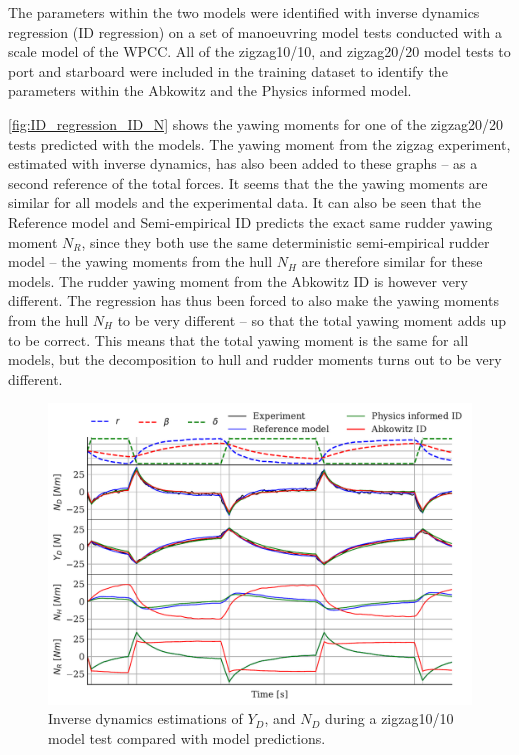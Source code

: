 The parameters within the two models were identified with inverse dynamics regression (ID regression) on a set of manoeuvring model tests conducted with a scale model of the WPCC. All of the zigzag10/10, and zigzag20/20 model tests to port and starboard were included in the training dataset to identify the parameters within the Abkowitz and the Physics informed model.

\autoref{fig:ID_regression_ID_N} shows the yawing moments for one of the zigzag20/20 tests predicted with the models. The yawing moment from the zigzag experiment, estimated with inverse dynamics, has also been added to these graphs -- as a second reference of the total forces. It seems that the the yawing moments are similar for all models and the experimental data. It can also be seen that the Reference model and Semi-empirical ID predicts the exact same rudder yawing moment $N_R$, since they both use the same deterministic semi-empirical rudder model -- the yawing moments from the hull $N_H$ are therefore similar for these models. The rudder yawing moment from the Abkowitz ID is however very different. The regression has thus been forced to also make the yawing moments from the hull $N_H$ to be very different -- so that the total yawing moment adds up to be correct. This means that the total yawing moment is the same for all models, but the decomposition to hull and rudder moments turns out to be very different.
\begin{figure}[h]
    \centering
    \includegraphics[width=\columnwidth]{figures/results.ID_zigzag10.pdf}
    \caption{Inverse dynamics estimations of $Y_D$, and $N_D$ during a zigzag10/10 model test compared with model predictions.}
    \label{fig:ID_regression_ID_N}
\end{figure}
